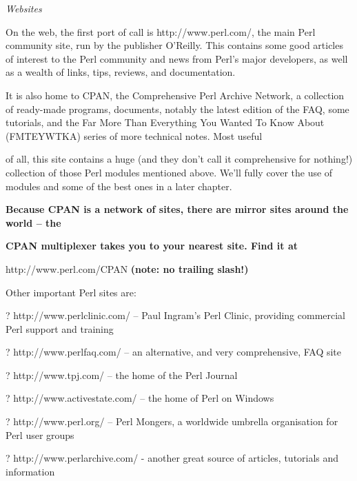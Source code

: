 \documentclass[a4paper,11pt]{book}
\begin{document}
\noindent 

\noindent \textit{Websites}

\noindent On the web, the first port of call is http://www.perl.com/, the main Perl community site, run by the publisher O'Reilly. This contains some good articles of interest to the Perl community and news from Perl's major developers, as well as a wealth of links, tips, reviews, and documentation.

\noindent 

\noindent It is also home to CPAN, the Comprehensive Perl Archive Network, a collection of ready-made programs, documents, notably the latest edition of the FAQ, some tutorials, and the Far More Than Everything You Wanted To Know About (FMTEYWTKA) series of more technical notes. Most useful

\noindent of all, this site contains a huge (and they don't call it comprehensive for nothing!) collection of those Perl modules mentioned above. We'll fully cover the use of modules and some of the best ones in a later chapter.

\noindent 

\noindent 

\noindent \textbf{Because CPAN is a network of sites, there are mirror sites around the world -- the}

\noindent \textbf{CPAN multiplexer takes you to your nearest site. Find it at}

\noindent http://www.perl.com/CPAN\textbf{ (note: no trailing slash!)}

\noindent 

\noindent 

\noindent Other important Perl sites are:

\noindent 

\noindent ? http://www.perlclinic.com/ -- Paul Ingram's Perl Clinic, providing commercial Perl support and training

\noindent ? http://www.perlfaq.com/ -- an alternative, and very comprehensive, FAQ site

\noindent ? http://www.tpj.com/ -- the home of the Perl Journal

\noindent ? http://www.activestate.com/ -- the home of Perl on Windows

\noindent ? http://www.perl.org/ -- Perl Mongers, a worldwide umbrella organisation for Perl user groups

\noindent ? http://www.perlarchive.com/ - another great source of articles, tutorials and information
\end{document}
